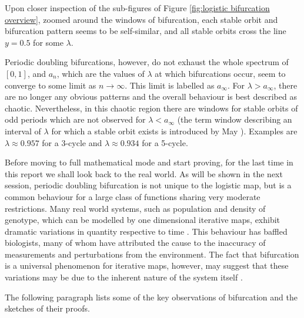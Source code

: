 Upon closer inspection of the sub-figures of Figure \ref{fig:logistic bifurcation overview}, zoomed around the windows of bifurcation, each stable orbit and bifurcation pattern seems to be self-similar, and all stable orbits cross the line $y = 0.5$ for some $\lambda$.

Periodic doubling bifurcations, however, do not exhaust the whole spectrum of $[0,1]$, and $a_{n}$, which are the values of $\lambda$ at which bifurcations occur, seem to converge to some limit as $n \rightarrow \infty$. 
This limit is labelled as $a_{\infty}$.
For $\lambda > a_{\infty}$, there are no longer any obvious patterns and the overall behaviour is best described as chaotic. 
Nevertheless, in this chaotic region there are windows for stable orbits of odd periods which are not observed for $\lambda < a_{\infty}$ (the term window describing an interval of $\lambda$ for which a stable orbit exists is introduced by May \cite{May_Nature}).
Examples are $\lambda \approx 0.957$ for a 3-cycle and $\lambda \approx 0.934$ for a 5-cycle.

Before moving to full mathematical mode and start proving, for the last time in this report we shall look back to the real world. 
As will be shown in the next session, periodic doubling bifurcation is not unique to the logistic map, but is a common behaviour for a large class of functions sharing very moderate restrictions. 
Many real world systems, such as population and density of genotype, which can be modelled by one dimensional iterative maps, exhibit dramatic variations in quantity respective to time \cite{colorado_potato_beetle}.
This behaviour has baffled biologists, many of whom have attributed the cause to the inaccuracy of measurements and perturbations from the environment. 
The fact that bifurcation is a universal phenomenon for iterative maps, however, may suggest that these variations may be due to the inherent nature of the system itself \cite{genotype}.


The following paragraph lists some of the key observations of bifurcation and the sketches of their proofs.

